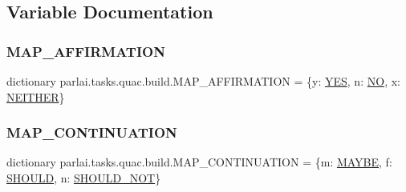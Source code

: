 \subsection{Variable Documentation}
\mbox{\label{namespaceparlai_1_1tasks_1_1quac_1_1build_ab20c3d8515482b46022a2dbd6b0065a3}} 
\subsubsection{\texorpdfstring{M\+A\+P\+\_\+\+A\+F\+F\+I\+R\+M\+A\+T\+I\+ON}{MAP\_AFFIRMATION}}
{\footnotesize\ttfamily dictionary parlai.\+tasks.\+quac.\+build.\+M\+A\+P\+\_\+\+A\+F\+F\+I\+R\+M\+A\+T\+I\+ON = \{\textquotesingle{}y\textquotesingle{}\+: \hyperlink{namespaceparlai_1_1tasks_1_1quac_1_1build_ae765b76a84d02581f82b38b996795052}{Y\+ES}, \textquotesingle{}n\textquotesingle{}\+: \hyperlink{namespaceparlai_1_1tasks_1_1quac_1_1build_a50beb08d880b27c076327f5a0a26d2e5}{NO}, \textquotesingle{}x\textquotesingle{}\+: \hyperlink{namespaceparlai_1_1tasks_1_1quac_1_1build_aea3d40b1bffbd55955c5d462803932c1}{N\+E\+I\+T\+H\+ER}\}}

\mbox{\label{namespaceparlai_1_1tasks_1_1quac_1_1build_a4c0429a20d4b3f822b92a2897131ee2d}} 
\subsubsection{\texorpdfstring{M\+A\+P\+\_\+\+C\+O\+N\+T\+I\+N\+U\+A\+T\+I\+ON}{MAP\_CONTINUATION}}
{\footnotesize\ttfamily dictionary parlai.\+tasks.\+quac.\+build.\+M\+A\+P\+\_\+\+C\+O\+N\+T\+I\+N\+U\+A\+T\+I\+ON = \{\textquotesingle{}m\textquotesingle{}\+: \hyperlink{namespaceparlai_1_1tasks_1_1quac_1_1build_a0591761190bee9bc4e39f88d0f374e86}{M\+A\+Y\+BE}, \textquotesingle{}f\textquotesingle{}\+: \hyperlink{namespaceparlai_1_1tasks_1_1quac_1_1build_a5f8e1b371211c16c440b76b8ae3f3af6}{S\+H\+O\+U\+LD}, \textquotesingle{}n\textquotesingle{}\+: \hyperlink{namespaceparlai_1_1tasks_1_1quac_1_1build_af323f9b5375de6cea2bca8b24615a464}{S\+H\+O\+U\+L\+D\+\_\+\+N\+OT}\}}

